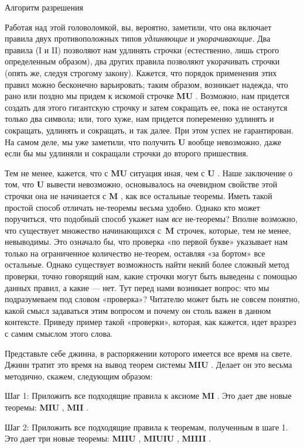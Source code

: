 Алгоритм разрешения

Работая над этой головоломкой, вы, вероятно, заметили, что она включает правила двух противоположных типов \emph{удлиняющие} и \emph{укорачивающие.} Два правила (I и II) позволяют нам удлинять строчки (естественно, лишь строго определенным образом), два других правила позволяют укорачивать строчки (опять же, следуя строгому закону). Кажется, что порядок применения этих правил можно бесконечно варьировать; таким образом, возникает надежда, что рано или поздно мы придем к искомой строчке \textbf{MU} . Возможно, нам придется создать для этого гигантскую строчку и затем сокращать ее, пока не останутся только два символа; или, того хуже, нам придется попеременно удлинять и сокращать, удлинять и сокращать, и так далее. При этом успех не гарантирован. На самом деле, мы уже заметили, что получить \textbf{U} вообще невозможно, даже если бы мы удлиняли и сокращали строчки до второго пришествия.

Тем не менее, кажется, что с \textbf{MU} ситуация иная, чем с \textbf{U} . Наше заключение о том, что \textbf{U} вывести невозможно, основывалось на очевидном свойстве этой строчки она не начинается с \textbf{M} , как все остальные теоремы. Иметь такой простой способ отличать не-теоремы весьма удобно. Однако кто может поручиться, что подобный способ укажет нам \emph{все} не-теоремы? Вполне возможно, что существует множество начинающихся с~\textbf{M} строчек, которые, тем не менее, невыводимы. Это означало бы, что проверка «по первой букве» указывает нам только на ограниченное количество не-теорем, оставляя «за бортом» все остальные. Однако существует возможность найти некий более сложный метод проверки, точно говорящий нам, какие строчки могут быть выведены с помощью данных правил, а какие --- нет. Тут перед нами возникает вопрос: что мы подразумеваем под словом «проверка»? Читателю может быть не совсем понятно, какой смысл задаваться этим вопросом и почему он столь важен в данном контексте. Приведу пример такой «проверки», которая, как кажется, идет вразрез с самим смыслом этого слова.

Представьте себе джинна, в распоряжении которого имеется все время на свете. Джинн тратит это время на вывод теорем системы \textbf{MIU} . Делает он это весьма методично, скажем, следующим образом:

Шаг 1: Приложить все подходящие правила к аксиоме \textbf{MI} . Это дает две новые теоремы: \textbf{MIU} , \textbf{MII} .

Шаг 2: Приложить все подходящие правила к теоремам, полученным в шаге 1. Это дает три новые теоремы: \textbf{MIIU} , \textbf{MIUIU} , \textbf{MIIII} .

